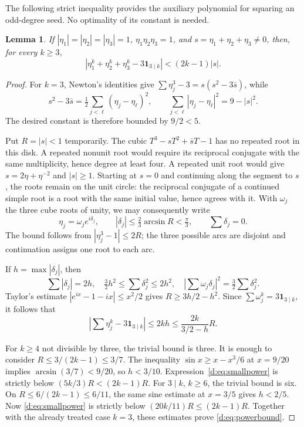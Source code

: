 \documentclass[UTF8,11pt]{ctexart}
\newtheorem{lem}[thm]{Lemma}
\theoremstyle{definition}
\numberwithin{equation}{section}
\begin{document}
The following strict inequality provides the auxiliary polynomial for
squaring an odd-degree seed. No optimality of its constant is needed.
\begin{lem}\label{d:lem:powers}
If $|\eta_1|=|\eta_2|=|\eta_3|=1$, $\eta_1\eta_2\eta_3=1$, and
$s=\eta_1+\eta_2+\eta_3\ne0$, then, for every $k\ge3$,
\begin{equation}\label{d:eq:powerbound}
 \left|\eta_1^k+\eta_2^k+\eta_3^k-3\mathbf1_{3\mid k}\right|
 <(2k-1)|s|.
\end{equation}
\end{lem}
\begin{proof}
For $k=3$, Newton's identities give
$\sum\eta_j^3-3=s(s^2-3\bar s)$, while
\[
 s^2-3\bar s=\tfrac12\sum_{j<\ell}(\eta_j-\eta_\ell)^2,
 \qquad \sum_{j<\ell}|\eta_j-\eta_\ell|^2=9-|s|^2.
\]
The desired constant is therefore bounded by $9/2<5$.

Put $R=|s|<1$ temporarily. The cubic
$T^3-sT^2+\bar sT-1$ has no repeated root in this disk. A repeated
nonunit root would require its reciprocal conjugate with the same
multiplicity, hence degree at least four. A repeated unit root would
give $s=2\eta+\eta^{-2}$ and $|s|\ge1$.
Starting at $s=0$ and continuing along the segment to $s$, the roots
remain on the unit circle: the reciprocal conjugate of a continued
simple root is a root with the same initial value, hence agrees with it.
With $\omega_j$ the three cube roots of unity, we may consequently write
\[
 \eta_j=\omega_j e^{i\delta_j},\qquad
 |\delta_j|\le\tfrac23\arcsin R<\tfrac\pi3,
 \qquad\sum\delta_j=0.
\]
The bound follows from $|\eta_j^3-1|\le2R$; the three possible arcs are
disjoint and continuation assigns one root to each arc.

If $h=\max|\delta_j|$, then
\[
 \sum|\delta_j|=2h,\quad
 \tfrac32h^2\le\sum\delta_j^2\le2h^2,\quad
 \left|\sum\omega_j\delta_j\right|^2=\tfrac32\sum\delta_j^2.
\]
Taylor's estimate $|e^{ix}-1-ix|\le x^2/2$ gives $R\ge3h/2-h^2$.
Since $\sum\omega_j^k=3\mathbf1_{3\mid k}$, it follows that
\begin{equation}\label{d:eq:smallpower}
 \left|\sum\eta_j^k-3\mathbf1_{3\mid k}\right|
 \le2kh\le\frac{2k}{3/2-h}R.
\end{equation}

For $k\ge4$ not divisible by three, the trivial bound is three. It is
enough to consider $R\le3/(2k-1)\le3/7$. The inequality
$\sin x\ge x-x^3/6$ at $x=9/20$ implies
$\arcsin(3/7)<9/20$, so $h<3/10$. Expression~\eqref{d:eq:smallpower}
is strictly below $(5k/3)R<(2k-1)R$.
For $3\mid k$, $k\ge6$, the trivial bound is six. On
$R\le6/(2k-1)\le6/11$, the same sine estimate at $x=3/5$ gives
$h<2/5$. Now \eqref{d:eq:smallpower} is strictly below
$(20k/11)R\le(2k-1)R$. Together with the already treated case $k=3$,
these estimates prove \eqref{d:eq:powerbound}.
\end{proof}
\end{document}
